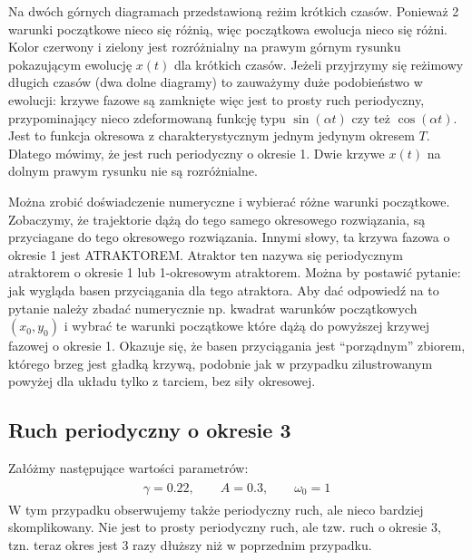 \documentclass[a4paper,12pt,polish]{sphinxmanual}
\begin{document}
Na dwóch górnych diagramach przedstawioną reżim krótkich czasów. Ponieważ 2 warunki początkowe nieco się różnią, więc początkowa ewolucja nieco się różni. Kolor czerwony i zielony jest rozróżnialny na prawym górnym rysunku pokazującym ewolucję $x(t)$ dla krótkich czasów.  Jeżeli przyjrzymy się reżimowy długich czasów (dwa dolne diagramy) to zauważymy duże podobieństwo w ewolucji: krzywe fazowe są zamknięte więc jest to prosty ruch periodyczny, przypominający nieco zdeformowaną funkcję typu $\sin(\alpha t)$ czy też $\cos(\alpha t)$. Jest to funkcja okresowa z charakterystycznym jednym jedynym  okresem $T$. Dlatego mówimy, że jest ruch periodyczny o okresie 1. Dwie krzywe $x(t)$ na dolnym prawym rysunku nie są rozróżnialne.

Można zrobić doświadczenie numeryczne i wybierać różne warunki początkowe. Zobaczymy, że trajektorie dążą do tego samego okresowego rozwiązania, są przyciagane do tego okresowego rozwiązania. Innymi słowy, ta krzywa fazowa o okresie 1  jest ATRAKTOREM.  Atraktor ten nazywa się periodycznym atraktorem o okresie 1 lub 1-okresowym  atraktorem. Można by postawić pytanie: jak wygląda basen przyciągania dla tego atraktora. Aby dać odpowiedź na to pytanie należy zbadać numerycznie np. kwadrat warunków początkowych  $(x_0, y_0)$ i wybrać te warunki początkowe które dążą do powyższej krzywej fazowej o okresie 1. Okazuje się, że basen przyciągania jest ``porządnym'' zbiorem, którego brzeg jest gładką krzywą, podobnie jak w przypadku zilustrowanym powyżej dla układu tylko z tarciem, bez siły okresowej.


\subsection{Ruch periodyczny o okresie 3}
\label{ch2/chII011:ruch-periodyczny-o-okresie-3}
Załóżmy następujące wartości parametrów:
\label{ch2/chII011:equation-eqn20}\begin{gather}
\begin{split}\gamma = 0.22, \qquad A = 0.3, \qquad \omega_0 = 1\end{split}\label{ch2/chII011-eqn20}
\end{gather}
W tym przypadku obserwujemy także periodyczny ruch, ale nieco bardziej skomplikowany. Nie jest to prosty periodyczny ruch, ale tzw. ruch o okresie 3, tzn. teraz okres jest 3 razy dłuższy niż w poprzednim przypadku.
\end{document}
